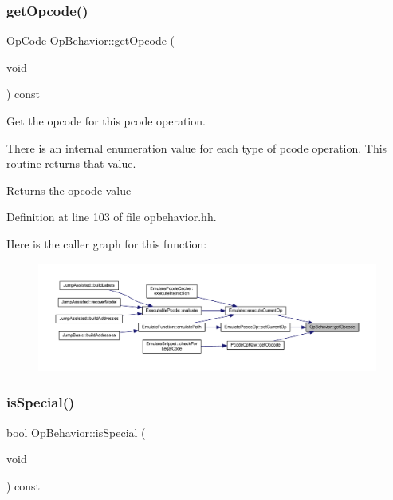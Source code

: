 \subsubsection{\texorpdfstring{getOpcode()}{getOpcode()}}
{\footnotesize\ttfamily \mbox{\hyperlink{opcodes_8hh_abeb7dfb0e9e2b3114e240a405d046ea7}{Op\+Code}} Op\+Behavior\+::get\+Opcode (\begin{DoxyParamCaption}\item[{void}]{ }\end{DoxyParamCaption}) const\hspace{0.3cm}{\ttfamily [inline]}}



Get the opcode for this pcode operation. 

There is an internal enumeration value for each type of pcode operation. This routine returns that value. \begin{DoxyReturn}{Returns}
the opcode value 
\end{DoxyReturn}


Definition at line 103 of file opbehavior.\+hh.

Here is the caller graph for this function\+:
\nopagebreak
\begin{figure}[H]
\begin{center}
\leavevmode
\includegraphics[width=350pt]{class_op_behavior_ad18c6673c9092dbfe3459224093998e8_icgraph}
\end{center}
\end{figure}
\mbox{\label{class_op_behavior_ae7d553131d5eff60ff3e2f15c072a8af}} 
\subsubsection{\texorpdfstring{isSpecial()}{isSpecial()}}
{\footnotesize\ttfamily bool Op\+Behavior\+::is\+Special (\begin{DoxyParamCaption}\item[{void}]{ }\end{DoxyParamCaption}) const\hspace{0.3cm}{\ttfamily [inline]}}



